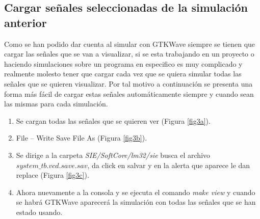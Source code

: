 \documentclass[10pt,graphicx,caption,rotating]{article}
\begin{document}
\subsection{Cargar señales seleccionadas de la simulación anterior}
\noindent
Como se han podido dar cuenta al simular con GTKWave siempre se tienen que cargar las señales que se van a visualizar, si se esta trabajando en un proyecto o haciendo simulaciones sobre un programa en especifico es muy complicado y realmente molesto tener que cargar cada vez que se quiera simular todas las señales que se quieren visualizar. Por tal motivo a continuación se presenta una forma más fácil de cargar estas señales automáticamente siempre y cuando sean las mismas para cada simulación.
\begin{enumerate}
 \item Se cargan todas las señales que se quieren ver (Figura \ref{fig3a}).
 \item File – Write Save File As (Figura \ref{fig3b}).
 \item Se dirige a la carpeta \textit{SIE/SoftCore/lm32/sie} busca el archivo $system\_tb.vcd.save.sav$, da click en salvar y en la alerta que aparece le dan replace (Figura \ref{fig3c}).
 \item Ahora nuevamente a la consola y se ejecuta el comando \textit{make view} y cuando se habrá GTKWave aparecerá la simulación con todas las señales que se han estado usando.
\end{enumerate}
\end{document}
